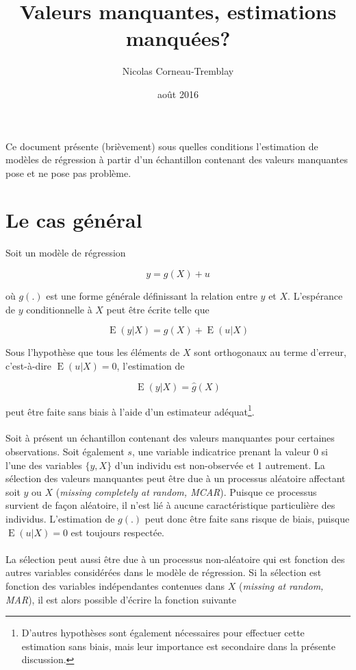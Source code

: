 \documentclass{article}
\title{Valeurs manquantes, estimations manqu\'{e}es?}
\author{Nicolas Corneau-Tremblay}
\date{ao\^{u}t 2016}
\DeclareMathOperator{\esp}{E}
\begin{document}
\maketitle

Ce document pr\'{e}sente (bri\`{e}vement) sous quelles conditions l'estimation de mod\`{e}les de r\'{e}gression \`{a} partir d'un \'{e}chantillon contenant des valeurs manquantes pose et ne pose pas  probl\`{e}me.

\section{Le cas g\'{e}n\'{e}ral}
Soit un mod\`{e}le de r\'{e}gression 

\[y=g(X)+u\]

o\`{u} $g(.)$ est une forme g\'{e}n\'{e}rale d\'{e}finissant la relation entre $y$ et $X$. L'esp\'{e}rance de $y$ conditionnelle \`{a} $X$ peut \^{e}tre \'{e}crite telle que

\[\esp(y|X)=g(X)+\esp(u|X)\]

Sous l'hypoth\`{e}se  que tous les \'{e}l\'{e}ments de $X$ sont orthogonaux au terme d'erreur, c'est-\`a-dire $\esp(u|X)=0$, l'estimation de

\[\esp(y|X)=\hat{g}(X)\]

peut \^{e}tre faite sans biais \`{a} l'aide d'un estimateur ad\'{equat}\footnote{D'autres hypoth\`{e}ses sont \'{e}galement n\'{e}cessaires pour effectuer cette estimation sans biais, mais leur importance est secondaire dans la pr\'{e}sente discussion.}. 
\\
\\
Soit \`{a} pr\'{e}sent un \'{e}chantillon contenant des valeurs manquantes pour certaines observations. Soit \'{e}galement $s$, une variable indicatrice prenant la valeur 0 si l'une des variables $\{y,X\}$ d'un individu est non-observ\'{e}e et 1 autrement. La s\'{e}lection des valeurs manquantes peut \^{e}tre due \`{a} un processus al\'{e}atoire affectant  soit $y$ ou $X$ (\textit{missing completely at random, MCAR}). Puisque ce processus survient de fa\c{c}on  al\'{e}atoire, il n'est li\'{e} \`{a} aucune caract\'{e}ristique particuli\`ere des individus. L'estimation de $g(.)$ peut donc \^{e}tre faite sans risque de biais, puisque $\esp(u|X)=0$ est toujours respect\'{e}e.
\\
\\
La s\'{e}lection peut aussi \^{e}tre due \`{a} un processus non-al\'{e}atoire qui est fonction des autres variables consid\'{e}r\'{e}es dans le mod\`{e}le de r\'{e}gression. Si la s\'{e}lection est fonction des variables ind\'{e}pendantes contenues dans $X$ (\textit{missing at random, MAR}), il est alors possible d'\'{e}crire la fonction suivante
\end{document}
